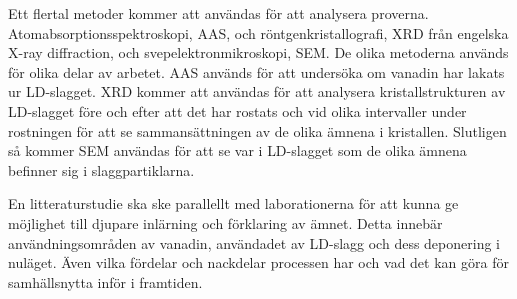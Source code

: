  Ett flertal metoder kommer att användas för att analysera proverna. Atomabsorptionsspektroskopi, AAS, och röntgenkristallografi, XRD från engelska X-ray diffraction, och svepelektronmikroskopi, SEM. De olika metoderna används för olika delar av arbetet. AAS används för att undersöka om vanadin har lakats ur LD-slagget. XRD kommer att användas för att analysera kristallstrukturen av LD-slagget före och efter att det har rostats och vid olika intervaller under rostningen för att se sammansättningen av de olika ämnena i kristallen. Slutligen så kommer SEM användas för att se var i LD-slagget som de olika ämnena befinner sig i slaggpartiklarna. 

En litteraturstudie ska ske parallellt med laborationerna för att kunna ge möjlighet till djupare inlärning och förklaring av ämnet. Detta innebär användningsområden av vanadin, användadet av LD-slagg och dess deponering i nuläget. Även vilka fördelar och nackdelar processen har och vad det kan göra för samhällsnytta inför i framtiden. 